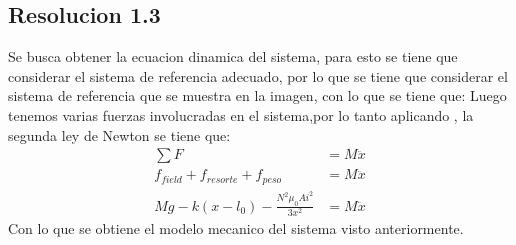 \documentclass[
  11pt,
  letterpaper,
   addpoints,
   answers
  ]{exam}
\begin{document}
\begin{questions}
\begin{solution}
        \subsection*{Resolucion 1.3}
        Se busca obtener la ecuacion dinamica del sistema, para esto se tiene que considerar el sistema de referencia adecuado, por lo que se tiene que considerar el sistema de referencia que se muestra en la imagen, con lo que se tiene que:
        Luego tenemos varias fuerzas involucradas en el sistema,por lo tanto aplicando , la segunda ley de Newton se tiene que:
        \begin{align}
            \sum F &= M\ddot{x}\\
            f_{field} + f_{resorte} + f_{peso} &= M\ddot{x}\\
            Mg - k(x-l_{0}) - \frac{N^{2}\mu_{0}Ai^{2}}{3x^{2}} &= M\ddot{x}
        \end{align}
        Con lo que se obtiene el modelo mecanico del sistema visto anteriormente.

\end{solution}
\end{questions}
\end{document}
